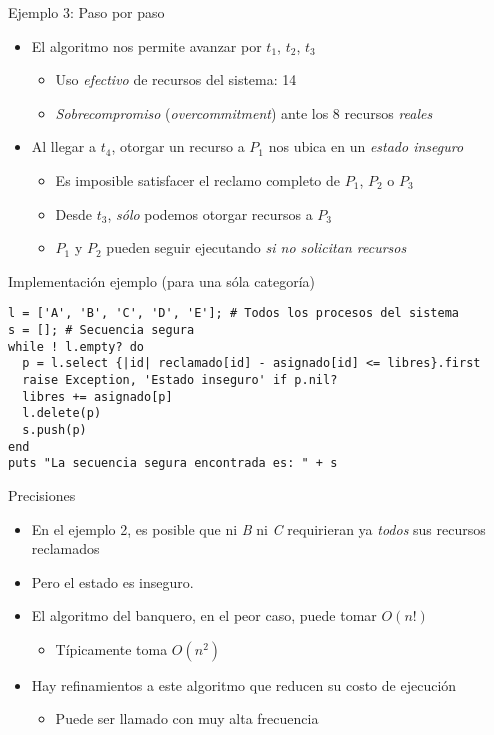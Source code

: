 \documentclass[presentation]{beamer}
\begin{document}
\begin{frame}[label={sec:orgc12d69c}]{Ejemplo 3: Paso por paso}
\begin{itemize}
\item El algoritmo nos permite avanzar por \(t_1\), \(t_2\), \(t_3\)
\begin{itemize}
\item Uso \emph{efectivo} de recursos del sistema: 14
\item \emph{Sobrecompromiso} (\emph{overcommitment}) ante los 8 recursos \emph{reales}
\end{itemize}
\item Al llegar a \(t_4\), otorgar un recurso a \(P_1\) nos ubica en un
\emph{estado inseguro}
\begin{itemize}
\item Es imposible satisfacer el reclamo completo de \(P_1\), \(P_2\) o \(P_3\)
\item Desde \(t_3\), \emph{sólo} podemos otorgar recursos a \(P_3\)
\item \(P_1\) y \(P_2\) pueden seguir ejecutando \emph{si no solicitan recursos}
\end{itemize}
\end{itemize}
\end{frame}

\begin{frame}[label={sec:org4b6ee80},fragile]{Implementación ejemplo (para una sóla categoría)}
 \begin{verbatim}
l = ['A', 'B', 'C', 'D', 'E']; # Todos los procesos del sistema
s = []; # Secuencia segura
while ! l.empty? do
  p = l.select {|id| reclamado[id] - asignado[id] <= libres}.first
  raise Exception, 'Estado inseguro' if p.nil?
  libres += asignado[p]
  l.delete(p)
  s.push(p)
end
puts "La secuencia segura encontrada es: " + s
\end{verbatim}
\end{frame}

\begin{frame}[label={sec:orgcc1ca9a}]{Precisiones}
\begin{itemize}
\item En el ejemplo 2, es posible que ni \emph{B} ni \emph{C} requirieran ya \emph{todos}
sus recursos reclamados
\item Pero el estado es inseguro.
\item El algoritmo del banquero, en el peor caso, puede tomar \(O(n!)\)
\begin{itemize}
\item Típicamente toma \(O(n^2)\)
\end{itemize}
\item Hay refinamientos a este algoritmo que reducen su costo de ejecución
\begin{itemize}
\item Puede ser llamado con muy alta frecuencia
\end{itemize}
\end{itemize}
\end{frame}
\end{document}
